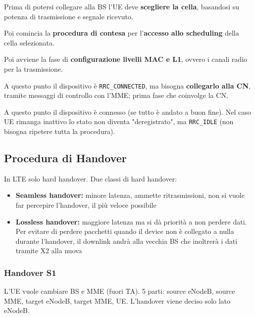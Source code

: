 Prima di potersi collegare alla BS l'UE deve \textbf{scegliere la cella}, basandosi su potenza di trasmissione e segnale ricevuto. 

Poi comincia la \textbf{procedura di contesa} per l'\textbf{accesso allo scheduling} della cella selezionata.

Poi avviene la fase di \textbf{configurazione livelli MAC e L1}, ovvero i canali radio per la trasmissione.

A questo punto il dispositivo è \texttt{RRC\_CONNECTED}, ma bisogna \textbf{collegarlo alla CN}, tramite messaggi di controllo con l'MME; prima fase che coinvolge la CN.

A questo punto il dispositivo è connesso (se tutto è andato a buon fine). Nel caso UE rimanga inattivo lo stato non diventa "deregistrato", ma \texttt{RRC\_IDLE} (non bisogna ripetere tutta la procedura).

\subsection{Procedura di Handover}

In LTE solo hard handover. Due classi di hard handover: 
\begin{itemize}
    \item \textbf{Seamless handover:} minore latenza, ammette ritrasmissioni, non si vuole far percepire l'handover, il più veloce possibile 
    
    \item \textbf{Lossless handover:} maggiore latenza ma si dà priorità a non perdere dati. Per evitare di perdere pacchetti quando il device non è collegato a nulla durante l'handover, il downlink andrà alla vecchia BS che inoltrerà i dati tramite X2 alla nuova
\end{itemize}

\subsubsection{Handover S1}

L'UE vuole cambiare BS e MME (fuori TA). 5 parti: source eNodeB, source MME, target eNodeB, target MME, UE. L'handover viene deciso solo lato eNodeB. 

